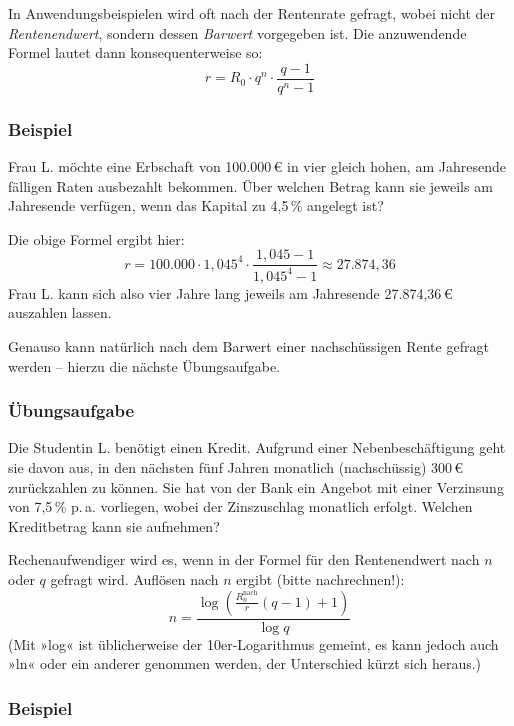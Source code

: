 In Anwendungsbeispielen wird oft nach der Rentenrate gefragt, wobei nicht der \emph{Rentenendwert}, sondern dessen \emph{Barwert} vorgegeben ist. Die anzuwendende Formel lautet dann konsequenterweise so:
\[ r = R_0 \cdot q^n \cdot \frac{q - 1}{q^n - 1} \]

\subsubsection{Beispiel}

Frau L. möchte eine Erbschaft von 100.000\,€ in vier gleich hohen, am Jahresende fälligen Raten ausbezahlt bekommen. Über welchen Betrag kann sie jeweils am Jahresende verfügen, wenn das Kapital zu 4{,}5\,\% angelegt ist?

Die obige Formel ergibt hier:
\[ r = 100.000 \cdot 1{,}045^4 \cdot \frac{1{,}045 - 1}{1{,}045^4 - 1} \approx 27.874{,}36 \]
Frau L. kann sich also vier Jahre lang jeweils am Jahresende 27.874{,}36\,€ auszahlen lassen.\beispielende

Genauso kann natürlich nach dem Barwert einer nachschüssigen Rente gefragt werden -- hierzu die nächste Übungsaufgabe.

\subsubsection{Übungsaufgabe}

\begin{graukasten}
  Die Studentin L. benötigt einen Kredit. Aufgrund einer Nebenbeschäftigung geht sie davon aus, in den nächsten fünf Jahren monatlich (nachschüssig) 300\,€ zurückzahlen zu können. Sie hat von der Bank ein Angebot mit einer Verzinsung von 7{,}5\,\% p.\,a. vorliegen, wobei der Zinszuschlag monatlich erfolgt. Welchen Kreditbetrag kann sie aufnehmen?
\end{graukasten}

Rechenaufwendiger wird es, wenn in der Formel für den Rentenendwert nach $n$ oder $q$ gefragt wird. Auflösen nach $n$ ergibt (bitte nachrechnen!):
\[ n = \frac{\log\left(\frac{R_n^{\text{nach}}}{r}(q - 1) + 1\right)}{\log q} \]
(Mit »log« ist üblicherweise der 10er-Logarithmus gemeint, es kann jedoch auch »ln« oder ein anderer genommen werden, der Unterschied kürzt sich heraus.)

\subsubsection{Beispiel}

